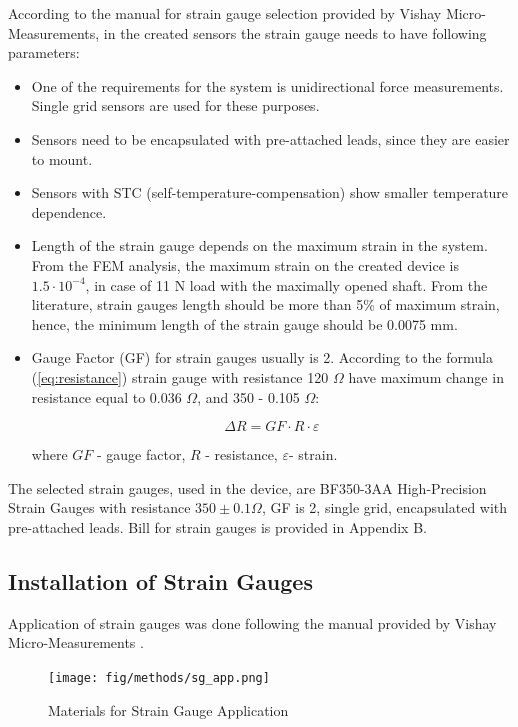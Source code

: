 According to the manual for strain gauge selection provided by Vishay Micro-Measurements, in the created sensors the strain gauge needs to have following parameters:
\begin{itemize}
  \item One of the requirements for the system is unidirectional force measurements. Single grid sensors are used for these purposes.
  \item Sensors need to be encapsulated with pre-attached leads, since they are easier to mount.
  \item Sensors with STC (self-temperature-compensation) show smaller temperature dependence.
\item Length of the strain gauge depends on the maximum strain in the system. From the FEM analysis, the maximum strain on the created device is $1.5 \cdot 10^{-4}$, in case of 11 N load with the maximally opened shaft. From the literature, strain gauges length should be more than 5\% of maximum strain, hence, the minimum length of the strain gauge should be 0.0075 mm. 
\item Gauge Factor (GF) for strain gauges usually is 2. According to the formula (\ref{eq:resistance}) strain gauge with resistance 120 $\Omega$ have maximum change in resistance equal to 0.036 $\Omega$, and 350  - 0.105 $\Omega$:

\begin{equation}\label{eq:resistance}
\Delta R=GF \cdot R \cdot \varepsilon
\end{equation}

where $GF$ - gauge factor, $R$ - resistance, $\varepsilon$- strain.
\end{itemize}    

The selected strain gauges, used in the device, are BF350-3AA High-Precision Strain Gauges with resistance $350 \pm 0.1 \Omega$, GF is 2, single grid, encapsulated with pre-attached leads. Bill for strain gauges is provided in Appendix B.

\subsection{Installation of Strain Gauges}
\label{sec:instSG}

	Application of strain gauges was done following the manual provided by Vishay Micro-Measurements \cite{StrGugeInst}.

\begin{figure}[h]
	\begin{center}
	\texttt{[image: fig/methods/sg\_app.png]}
	\end{center}
	\vspace{-4mm}
	\caption[Materials for Strain Gauge Application]
	{Materials for Strain Gauge Application}
	\label{fig:sg_app}
	\vspace{-2mm}
\end{figure}

